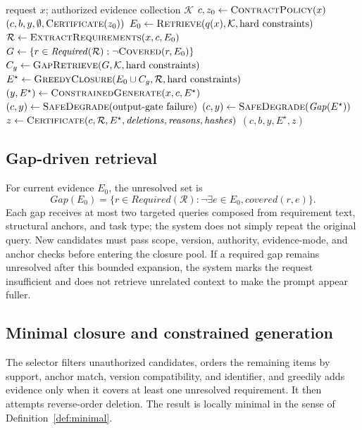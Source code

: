 \documentclass[11pt]{article}
\newcommand{\method}{CGA-MEC}
\begin{document}
\begin{algorithm}[t]
\caption{\method{} runtime decision}
\label{alg:cgamec}
\begin{algorithmic}[1]
\Require request $x$; authorized evidence collection $\mathcal{K}$
\State $c,z_0 \gets \Call{ContractPolicy}{x}$
  \State \Return $(c,b,y,\emptyset,\Call{Certificate}{z_0})$
\EndIf
\State $E_0 \gets \Call{Retrieve}{q(x),\mathcal{K},\text{hard constraints}}$
\State $\mathcal{R} \gets \Call{ExtractRequirements}{x,c,E_0}$
\State $G \gets \{r\in\mathit{Required}(\mathcal{R}): \neg\Call{Covered}{r,E_0}\}$
\State $C_g \gets \Call{GapRetrieve}{G,\mathcal{K},\text{hard constraints}}$
\State $E^\star \gets \Call{GreedyClosure}{E_0\cup C_g,\mathcal{R},\text{hard constraints}}$
  \State $(y,E^\star)\gets\Call{ConstrainedGenerate}{x,c,E^\star}$
    \State $(c,y)\gets\Call{SafeDegrade}{\text{output-gate failure}}$
  \EndIf
\Else
  \State $(c,y)\gets\Call{SafeDegrade}{\mathit{Gap}(E^\star)}$
\EndIf
\State $z \gets \Call{Certificate}{c,\mathcal{R},E^\star,\mathit{deletions},\mathit{reasons},\mathit{hashes}}$
\State \Return $(c,b,y,E^\star,z)$
\end{algorithmic}
\end{algorithm}

\subsection{Gap-driven retrieval}

For current evidence $E_0$, the unresolved set is
\[
\mathit{Gap}(E_0)=\{r\in\mathit{Required}(\mathcal{R}): \neg \exists e\in E_0,\mathit{covered}(r,e)\}.
\]
Each gap receives at most two targeted queries composed from requirement text, structural anchors, and task type; the system does not simply repeat the original query. New candidates must pass scope, version, authority, evidence-mode, and anchor checks before entering the closure pool. If a required gap remains unresolved after this bounded expansion, the system marks the request insufficient and does not retrieve unrelated context to make the prompt appear fuller.

\subsection{Minimal closure and constrained generation}

The selector filters unauthorized candidates, orders the remaining items by support, anchor match, version compatibility, and identifier, and greedily adds evidence only when it covers at least one unresolved requirement. It then attempts reverse-order deletion. The result is locally minimal in the sense of Definition~\ref{def:minimal}.
\end{document}

